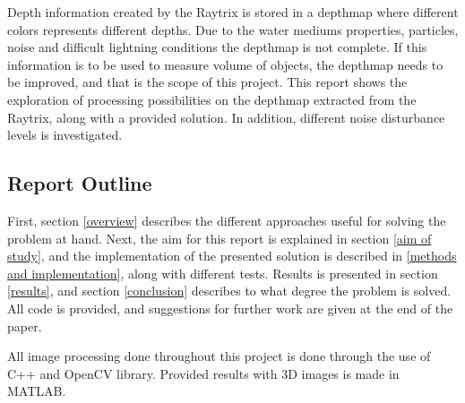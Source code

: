 Depth information created by the Raytrix is stored in a depthmap where different colors represents different depths. Due to the water mediums properties, particles, noise and difficult lightning conditions the depthmap is not complete. If this information is to be used to measure volume of objects, the depthmap needs to be improved, and that is the scope of this project. 
This report shows the exploration of processing possibilities on the depthmap extracted from the Raytrix, along with a provided solution. In addition, different noise disturbance levels is investigated.





\subsection{Report Outline} \label{report_outline}

First, section \ref{overview} describes the different approaches useful for solving the problem at hand. Next, the aim for this report is explained in section \ref{aim of study}, and the implementation of the presented solution is described in \ref{methods and implementation}, along with different tests. Results is presented in section \ref{results}, and section \ref{conclusion} describes to what degree the problem is solved. All code is provided, and suggestions for further work are given at the end of the paper.

All image processing done throughout this project is done through the use of C++ and OpenCV library. Provided results with 3D images is made in MATLAB.



